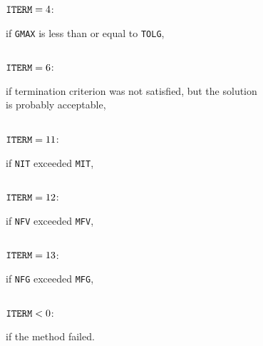 \documentclass{esub2acm}
\begin{document}
  \par
\noindent\parbox{30mm}{$\;$}\parbox{24mm}{${\tt ITERM}=4$:}\parbox[t]{101mm}{
  if {\tt GMAX} is less than or equal to {\tt TOLG},}
  \par
\noindent\parbox{30mm}{$\;$}\parbox{24mm}{${\tt ITERM}=6$:}\parbox[t]{101mm}{
  if termination criterion was not satisfied, but the solution \\ is probably
  acceptable,}
  \par
\noindent\parbox{30mm}{$\;$}\parbox{24mm}{${\tt ITERM}=11$:}\parbox[t]{101mm}{
  if {\tt NIT} exceeded {\tt MIT},}
  \par
\noindent\parbox{30mm}{$\;$}\parbox{24mm}{${\tt ITERM}=12$:}\parbox[t]{101mm}{
  if {\tt NFV} exceeded {\tt MFV},}
  \par
\noindent\parbox{30mm}{$\;$}\parbox{24mm}{${\tt ITERM}=13$:}\parbox[t]{101mm}{
  if {\tt NFG} exceeded {\tt MFG},}
  \par
\noindent\parbox{30mm}{$\;$}\parbox{24mm}{${\tt ITERM}<0$:}\parbox[t]{101mm}{
  if the method failed.}

\vspace{0.3cm}

\end{document}
